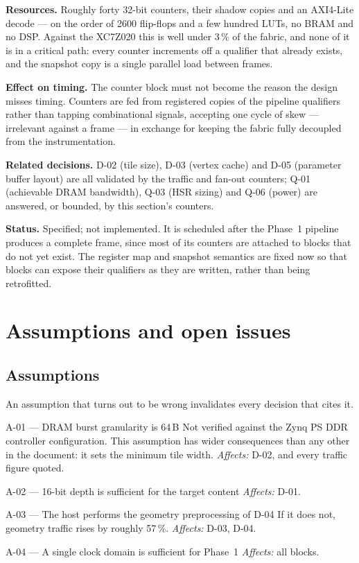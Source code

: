 \documentclass[11pt,a4paper]{article}
\newcommand{\field}[1]{\textbf{#1}\quad}
\begin{document}
\field{Resources.} Roughly forty 32-bit counters, their shadow copies and an
AXI4-Lite decode --- on the order of 2600 flip-flops and a few hundred LUTs, no
BRAM and no DSP. Against the XC7Z020 this is well under 3\,\% of the fabric, and
none of it is in a critical path: every counter increments off a qualifier that
already exists, and the snapshot copy is a single parallel load between frames.

\field{Effect on timing.} The counter block must not become the reason the
design misses timing. Counters are fed from registered copies of the pipeline
qualifiers rather than tapping combinational signals, accepting one cycle of
skew --- irrelevant against a frame --- in exchange for keeping the fabric fully
decoupled from the instrumentation.

\field{Related decisions.} D-02 (tile size), D-03 (vertex cache) and D-05
(parameter buffer layout) are all validated by the traffic and fan-out counters;
Q-01 (achievable DRAM bandwidth), Q-03 (HSR sizing) and Q-06 (power) are
answered, or bounded, by this section's counters.

\field{Status.} Specified; not implemented. It is scheduled after the Phase~1
pipeline produces a complete frame, since most of its counters are attached to
blocks that do not yet exist. The register map and snapshot semantics are fixed
now so that blocks can expose their qualifiers as they are written, rather than
being retrofitted.

\section{Assumptions and open issues}
\label{sec:assumptions}

\subsection{Assumptions}

An assumption that turns out to be wrong invalidates every decision that cites
it.

\begin{records}
\item[A-01 --- DRAM burst granularity is 64\,B]
Not verified against the Zynq PS DDR controller configuration. This assumption
has wider consequences than any other in the document: it sets the minimum tile
width. \emph{Affects:} D-02, and every traffic figure quoted.

\item[A-02 --- 16-bit depth is sufficient for the target content]
\emph{Affects:} D-01.

\item[A-03 --- The host performs the geometry preprocessing of D-04]
If it does not, geometry traffic rises by roughly 57\,\%. \emph{Affects:} D-03,
D-04.

\item[A-04 --- A single clock domain is sufficient for Phase~1]
\emph{Affects:} all blocks.
\end{records}
\end{document}
